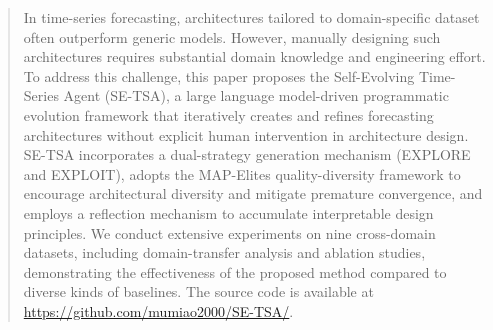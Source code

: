 \begin{abstract}

In time-series forecasting, architectures tailored to domain-specific dataset often outperform generic models. However, manually designing such architectures requires substantial domain knowledge and engineering effort. To address this challenge, this paper proposes the Self-Evolving Time-Series Agent (SE-TSA), a large language model-driven programmatic evolution framework that iteratively creates and refines forecasting architectures without explicit human intervention in architecture design. SE-TSA incorporates a dual-strategy generation mechanism (EXPLORE and EXPLOIT), adopts the MAP-Elites quality-diversity framework to encourage architectural diversity and mitigate premature convergence, and employs a reflection mechanism to accumulate interpretable design principles. We conduct extensive experiments on nine cross-domain datasets, including domain-transfer analysis and ablation studies, demonstrating the effectiveness of the proposed method compared to diverse kinds of baselines. The source code is available at \url{https://github.com/mumiao2000/SE-TSA/}.

\end{abstract}